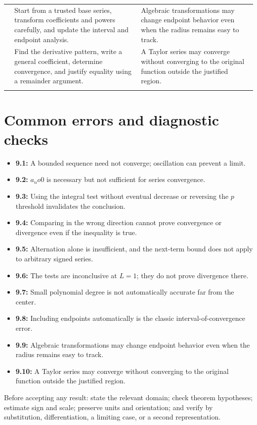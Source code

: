 \documentclass[11pt]{article}
\begin{document}
\begin{longtable}{@{}>{\RaggedRight\arraybackslash}p{}>{\RaggedRight\arraybackslash}p{}>{\RaggedRight\arraybackslash}p{}@{}}
9.9 & Start from a trusted base series, transform coefficients and powers carefully, and update the interval and endpoint analysis. & Algebraic transformations may change endpoint behavior even when the radius remains easy to track. \\\addlinespace[2pt]
9.10 & Find the derivative pattern, write a general coefficient, determine convergence, and justify equality using a remainder argument. & A Taylor series may converge without converging to the original function outside the justified region. \\\addlinespace[2pt]
\bottomrule
\end{longtable}
\normalsize

\section{Common errors and diagnostic checks}
\begin{warningbox}
\begin{itemize}
\item \textbf{9.1:} A bounded sequence need not converge; oscillation can prevent a limit.
\item \textbf{9.2:} $a_n	o0$ is necessary but not sufficient for series convergence.
\item \textbf{9.3:} Using the integral test without eventual decrease or reversing the $p$ threshold invalidates the conclusion.
\item \textbf{9.4:} Comparing in the wrong direction cannot prove convergence or divergence even if the inequality is true.
\item \textbf{9.5:} Alternation alone is insufficient, and the next-term bound does not apply to arbitrary signed series.
\item \textbf{9.6:} The tests are inconclusive at $L=1$; they do not prove divergence there.
\item \textbf{9.7:} Small polynomial degree is not automatically accurate far from the center.
\item \textbf{9.8:} Including endpoints automatically is the classic interval-of-convergence error.
\item \textbf{9.9:} Algebraic transformations may change endpoint behavior even when the radius remains easy to track.
\item \textbf{9.10:} A Taylor series may converge without converging to the original function outside the justified region.
\end{itemize}
\end{warningbox}
\begin{checkbox}
Before accepting any result: state the relevant domain; check theorem hypotheses; estimate sign and scale; preserve units and orientation; and verify by substitution, differentiation, a limiting case, or a second representation.
\end{checkbox}
\end{document}
